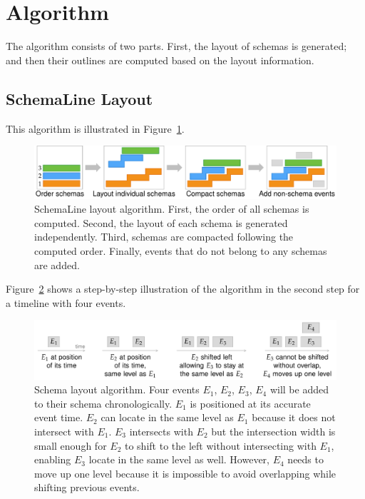 \section{Algorithm}
\label{sec:sl-algorithm}
The algorithm consists of two parts. First, the layout of schemas is generated; and then their outlines are computed based on the layout information.

\subsection{SchemaLine Layout}
This algorithm is illustrated in Figure~\ref{fig:sl-layout-overview}.

\begin{figure}[!htb]
	\centering
	\includegraphics[width=\linewidth]{layout-overview}
	\caption{SchemaLine layout algorithm. First, the order of all schemas is computed. Second, the layout of each schema is generated independently. Third, schemas are compacted following the computed order. Finally, events that do not belong to any schemas are added.}
	\label{fig:sl-layout-overview}
\end{figure}

Figure~\ref{fig:schema-layout-example} shows a step-by-step illustration of the algorithm in the second step for a timeline with four events.

\begin{figure}[!htb]
	\centering
	\includegraphics[width=\linewidth]{layout-example}
	\caption{Schema layout algorithm. Four events $E_1$, $E_2$, $E_3$, $E_4$ will be added to their schema chronologically. $E_1$ is positioned at its accurate event time. $E_2$ can locate in the same level as $E_1$ because it does not intersect with $E_1$. $E_3$ intersects with $E_2$ but the intersection width is small enough for $E_2$ to shift to the left without intersecting with $E_1$, enabling $E_3$ locate in the same level as well. However, $E_4$ needs to move up one level because it is impossible to avoid overlapping while shifting previous events.}
	\label{fig:schema-layout-example}
\end{figure}

